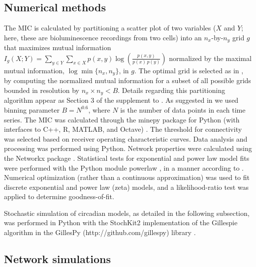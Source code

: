 \subsection*{Numerical methods}
The MIC is calculated by partitioning a scatter plot of two variables ($X$ and $Y$; here, these are bioluminescence recordings from two cells) into an $n_x$-by-$n_y$ grid $g$ that maximizes mutual information $I_g(X;Y) = \sum_{y \in Y} \sum_{x \in X}
                 p(x,y) \log{ \left(\frac{p(x,y)}{p(x)\,p(y)}
                              \right) }$
normalized by the maximal mutual information, $\log\min\{n_x,n_y\}$, in $g$.
The optimal grid is selected as in \cite{Reshef2011}, by computing the normalized mutual information for a subset of all possible grids bounded in resolution by $n_x\times n_y<B$.
Details regarding this partitioning algorithm appear as Section 3 of the supplement to \cite{Reshef2011}.
As suggested in \cite{Reshef2011} we used binning parameter $B = N^{0.6}$, where $N$ is the number of data points in each time series. 
The MIC was calculated through the minepy package for Python (with interfaces to C++, R, MATLAB, and Octave) \cite{Albanese2013}.
The threshold for connectivity was selected based on receiver operating characteristic curves. 
Data analysis and processing was performed using Python. Network properties were calculated using the Networkx package \cite{Hagberg2008}.
Statistical tests for exponential and power law model fits were performed with the Python module powerlaw \cite{Alstott2014}, in a manner according to \cite{Clauset2009}. 
Numerical optimization (rather than a continuous approximation) was used to fit discrete exponential and power law (zeta) models, and a likelihood-ratio test was applied to determine goodness-of-fit.

Stochastic simulation of circadian models, as detailed in the following subsection, was performed in Python with the StochKit2 implementation of the Gillespie algorithm in the GillesPy (http://github.com/gillespy) library \cite{Sanft2011, Abel2017}.

\subsection*{Network simulations}

